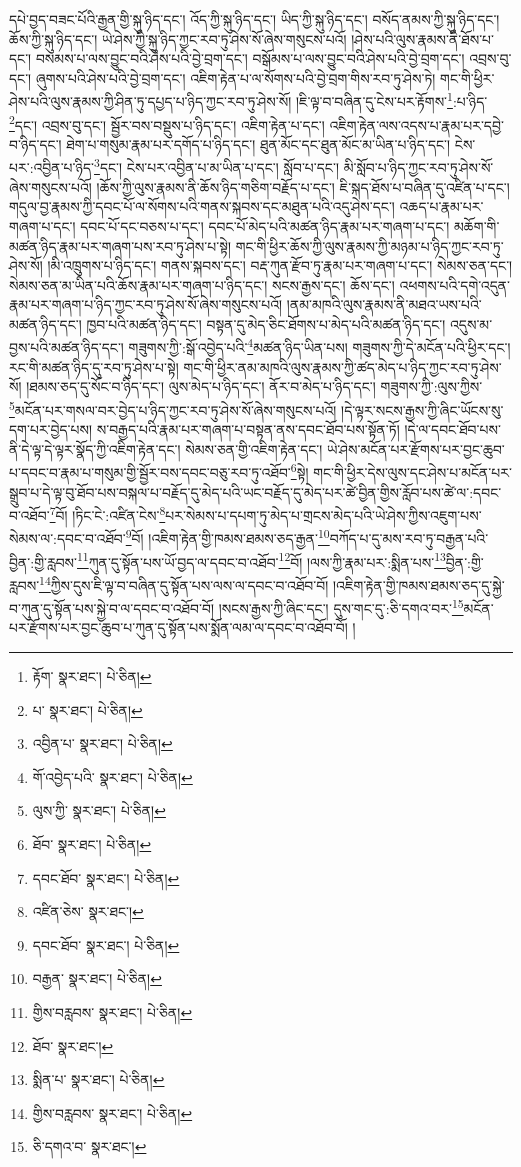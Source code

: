 དཔེ་བྱད་བཟང་པོའི་རྒྱན་གྱི་སྐུ་ཉིད་དང་། འོད་ཀྱི་སྐུ་ཉིད་དང་། ཡིད་ཀྱི་སྐུ་ཉིད་དང་། བསོད་ནམས་ཀྱི་སྐུ་ཉིད་དང་། ཆོས་ཀྱི་སྐུ་ཉིད་དང་། ཡེ་ཤེས་ཀྱི་སྐུ་ཉིད་ཀྱང་རབ་ཏུ་ཤེས་སོ་ཞེས་གསུངས་པའོ། །ཤེས་པའི་ལུས་རྣམས་ནི་ཐོས་པ་དང་། བསམས་པ་ལས་བྱུང་བའི་ཤེས་པའི་བྱེ་བྲག་དང་། བསྒོམས་པ་ལས་བྱུང་བའི་ཤེས་པའི་བྱེ་བྲག་དང་། འབྲས་བུ་དང་། ཞུགས་པའི་ཤེས་པའི་བྱེ་བྲག་དང་། འཇིག་རྟེན་པ་ལ་སོགས་པའི་བྱེ་བྲག་གིས་རབ་ཏུ་ཤེས་ཏེ། གང་གི་ཕྱིར་ཤེས་པའི་ལུས་རྣམས་ཀྱི་ཤིན་ཏུ་དཔྱད་པ་ཉིད་ཀྱང་རབ་ཏུ་ཤེས་སོ། །ཇི་ལྟ་བ་བཞིན་དུ་ངེས་པར་རྟོགས་\footnote{རྟོག་  སྣར་ཐང་།  པེ་ཅིན། }:པ་ཉིད་\footnote{པ་  སྣར་ཐང་།  པེ་ཅིན། }དང་། འབྲས་བུ་དང་། སྦྱོར་བས་བསྡུས་པ་ཉིད་དང་། འཇིག་རྟེན་པ་དང་། འཇིག་རྟེན་ལས་འདས་པ་རྣམ་པར་དབྱེ་བ་ཉིད་དང་། ཐེག་པ་གསུམ་རྣམ་པར་དགོད་པ་ཉིད་དང་། ཐུན་མོང་དང་ཐུན་མོང་མ་ཡིན་པ་ཉིད་དང་། ངེས་པར་:འབྱིན་པ་ཉིད་\footnote{འབྱིན་པ་  སྣར་ཐང་།  པེ་ཅིན། }དང་། ངེས་པར་འབྱིན་པ་མ་ཡིན་པ་དང་། སློབ་པ་དང་། མི་སློབ་པ་ཉིད་ཀྱང་རབ་ཏུ་ཤེས་སོ་ཞེས་གསུངས་པའོ། །ཆོས་ཀྱི་ལུས་རྣམས་ནི་ཆོས་ཉིད་གཅིག་བརྗོད་པ་དང་། ཇི་སྐད་ཐོས་པ་བཞིན་དུ་འཛིན་པ་དང་། གདུལ་བྱ་རྣམས་ཀྱི་དབང་པོ་ལ་སོགས་པའི་གནས་སྐབས་དང་མཐུན་པའི་འདུ་ཤེས་དང་། འཆད་པ་རྣམ་པར་གཞག་པ་དང་། དབང་པོ་དང་བཅས་པ་དང་། དབང་པོ་མེད་པའི་མཚན་ཉིད་རྣམ་པར་གཞག་པ་དང་། མཆོག་གི་མཚན་ཉིད་རྣམ་པར་གཞག་པས་རབ་ཏུ་ཤེས་པ་སྟེ། གང་གི་ཕྱིར་ཆོས་ཀྱི་ལུས་རྣམས་ཀྱི་མཉམ་པ་ཉིད་ཀྱང་རབ་ཏུ་ཤེས་སོ། །མི་འཁྲུགས་པ་ཉིད་དང་། གནས་སྐབས་དང་། བརྡ་ཀུན་རྫོབ་ཏུ་རྣམ་པར་གཞག་པ་དང་། སེམས་ཅན་དང་། སེམས་ཅན་མ་ཡིན་པའི་ཆོས་རྣམ་པར་གཞག་པ་ཉིད་དང་། སངས་རྒྱས་དང་། ཆོས་དང་། འཕགས་པའི་དགེ་འདུན་རྣམ་པར་གཞག་པ་ཉིད་ཀྱང་རབ་ཏུ་ཤེས་སོ་ཞེས་གསུངས་པའོ། །ནམ་མཁའི་ལུས་རྣམས་ནི་མཐའ་ཡས་པའི་མཚན་ཉིད་དང་། ཁྱབ་པའི་མཚན་ཉིད་དང་། བསྟན་དུ་མེད་ཅིང་ཐོགས་པ་མེད་པའི་མཚན་ཉིད་དང་། འདུས་མ་བྱས་པའི་མཚན་ཉིད་དང་། གཟུགས་ཀྱི་:སྒོ་འབྱེད་པའི་\footnote{གོ་འབྱེད་པའི་  སྣར་ཐང་།  པེ་ཅིན། }མཚན་ཉིད་ཡིན་པས། གཟུགས་ཀྱི་དེ་མངོན་པའི་ཕྱིར་དང་། རང་གི་མཚན་ཉིད་དུ་རབ་ཏུ་ཤེས་པ་སྟེ། གང་གི་ཕྱིར་ནམ་མཁའི་ལུས་རྣམས་ཀྱི་ཚད་མེད་པ་ཉིད་ཀྱང་རབ་ཏུ་ཤེས་སོ། །ཐམས་ཅད་དུ་སོང་བ་ཉིད་དང་། ལུས་མེད་པ་ཉིད་དང་། ནོར་བ་མེད་པ་ཉིད་དང་། གཟུགས་ཀྱི་:ལུས་ཀྱིས་\footnote{ལུས་ཀྱི་  སྣར་ཐང་།  པེ་ཅིན། }མངོན་པར་གསལ་བར་བྱེད་པ་ཉིད་ཀྱང་རབ་ཏུ་ཤེས་སོ་ཞེས་གསུངས་པའོ། །དེ་ལྟར་སངས་རྒྱས་ཀྱི་ཞིང་ཡོངས་སུ་དག་པར་བྱེད་པས། ས་བརྒྱད་པའི་རྣམ་པར་གཞག་པ་བསྟན་ནས་དབང་ཐོབ་པས་སྟོན་ཏོ། །དེ་ལ་དབང་ཐོབ་པས་ནི་དེ་ལྟ་དེ་ལྟར་སྣོད་ཀྱི་འཇིག་རྟེན་དང་། སེམས་ཅན་གྱི་འཇིག་རྟེན་དང་། ཡེ་ཤེས་མངོན་པར་རྫོགས་པར་བྱང་ཆུབ་པ་དབང་བ་རྣམ་པ་གསུམ་གྱི་སྦྱོར་བས་དབང་བཅུ་རབ་ཏུ་འཐོབ་\footnote{ཐོབ་  སྣར་ཐང་།  པེ་ཅིན། }སྟེ། གང་གི་ཕྱིར་དེས་ལུས་དང་ཤེས་པ་མངོན་པར་སྒྲུབ་པ་དེ་ལྟ་བུ་ཐོབ་པས་བསྐལ་པ་བརྗོད་དུ་མེད་པའི་ཡང་བརྗོད་དུ་མེད་པར་ཚེ་བྱིན་གྱིས་རློབ་པས་ཚེ་ལ་:དབང་བ་འཐོབ་\footnote{དབང་ཐོབ་  སྣར་ཐང་།  པེ་ཅིན། }བོ། །ཏིང་ངེ་:འཛིན་ངེས་\footnote{འཛིན་ཅེས་  སྣར་ཐང་། }པར་སེམས་པ་དཔག་ཏུ་མེད་པ་གྲངས་མེད་པའི་ཡེ་ཤེས་ཀྱིས་འཇུག་པས་སེམས་ལ་:དབང་བ་འཐོབ་\footnote{དབང་ཐོབ་  སྣར་ཐང་།  པེ་ཅིན། }བོ། །འཇིག་རྟེན་གྱི་ཁམས་ཐམས་ཅད་རྒྱན་\footnote{བརྒྱན་  སྣར་ཐང་།  པེ་ཅིན། }བཀོད་པ་དུ་མས་རབ་ཏུ་བརྒྱན་པའི་བྱིན་:གྱི་རླབས་\footnote{གྱིས་བརླབས་  སྣར་ཐང་།  པེ་ཅིན། }ཀུན་དུ་སྟོན་པས་ཡོ་བྱད་ལ་དབང་བ་འཐོབ་\footnote{ཐོབ་  སྣར་ཐང་། }བོ། །ལས་ཀྱི་རྣམ་པར་:སྨིན་པས་\footnote{སྨིན་པ་  སྣར་ཐང་།  པེ་ཅིན། }བྱིན་:གྱི་རླབས་\footnote{གྱིས་བརླབས་  སྣར་ཐང་།  པེ་ཅིན། }ཀྱིས་དུས་ཇི་ལྟ་བ་བཞིན་དུ་སྟོན་པས་ལས་ལ་དབང་བ་འཐོབ་བོ། །འཇིག་རྟེན་གྱི་ཁམས་ཐམས་ཅད་དུ་སྐྱེ་བ་ཀུན་དུ་སྟོན་པས་སྐྱེ་བ་ལ་དབང་བ་འཐོབ་བོ། །སངས་རྒྱས་ཀྱི་ཞིང་དང་། དུས་གང་དུ་:ཅི་དགའ་བར་\footnote{ཅི་དགའ་བ་  སྣར་ཐང་། }མངོན་པར་རྫོགས་པར་བྱང་ཆུབ་པ་ཀུན་དུ་སྟོན་པས་སྨོན་ལམ་ལ་དབང་བ་འཐོབ་བོ། །
